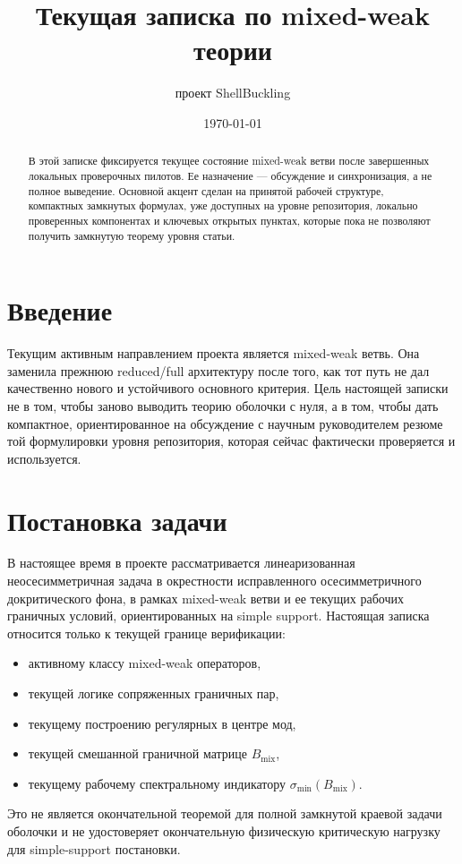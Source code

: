 \documentclass[11pt,a4paper]{article}
\title{Текущая записка по mixed-weak теории}
\author{проект ShellBuckling}
\date{\today}
\begin{document}
\maketitle

\begin{abstract}
В этой записке фиксируется текущее состояние mixed-weak ветви после
завершенных локальных проверочных пилотов.
Ее назначение --- обсуждение и синхронизация, а не полное выведение.
Основной акцент сделан на принятой рабочей структуре, компактных замкнутых
формулах, уже доступных на уровне репозитория, локально проверенных
компонентах и ключевых открытых пунктах, которые пока не позволяют получить
замкнутую теорему уровня статьи.
\end{abstract}

\section{Введение}
Текущим активным направлением проекта является mixed-weak ветвь.
Она заменила прежнюю reduced/full архитектуру после того, как тот путь не дал
качественно нового и устойчивого основного критерия.
Цель настоящей записки не в том, чтобы заново выводить теорию оболочки с нуля,
а в том, чтобы дать компактное, ориентированное на обсуждение с научным
руководителем резюме той формулировки уровня репозитория, которая сейчас
фактически проверяется и используется.

\section{Постановка задачи}
В настоящее время в проекте рассматривается линеаризованная неосесимметричная
задача в окрестности исправленного осесимметричного докритического фона,
в рамках mixed-weak ветви и ее текущих рабочих граничных условий,
ориентированных на simple support.
Настоящая записка относится только к текущей границе верификации:
\begin{itemize}[leftmargin=2em]
    \item активному классу mixed-weak операторов,
    \item текущей логике сопряженных граничных пар,
    \item текущему построению регулярных в центре мод,
    \item текущей смешанной граничной матрице $B_{\mathrm{mix}}$,
    \item текущему рабочему спектральному индикатору
    $\sigma_{\min}(B_{\mathrm{mix}})$.
\end{itemize}
Это не является окончательной теоремой для полной замкнутой краевой задачи
оболочки и не удостоверяет окончательную физическую критическую нагрузку для
simple-support постановки.
\end{document}
